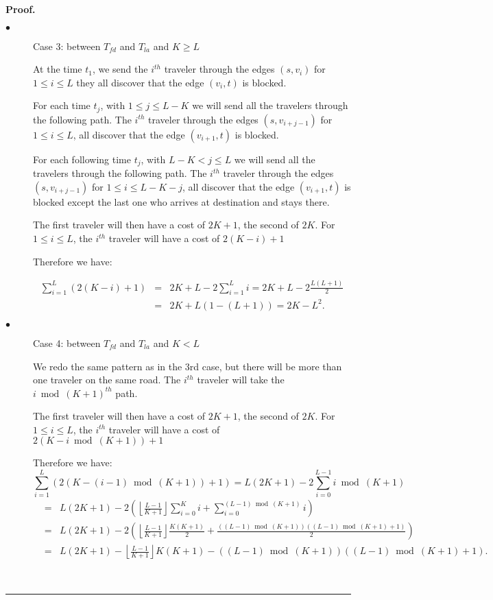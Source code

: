 \documentclass[a4paper, 10pt]{article}
\newenvironment{proof}[1][Proof]{\textbf{#1.} }{\ \rule{0.5em}{0.5em}}
\begin{document}
\begin{proof}
\begin{description}
\item[$\bullet$] Case 3: between $T_{fd}$ and $T_{la}$ and $K \geq L$

At the time $t_1$, we send the $i^{th}$ traveler through the edges $(s,v_i)$ for $1 \leq i \leq L$ they all discover that the edge $(v_i,t)$ is blocked.

For each time $t_j$, with $1 \leq j \leq L-K$ we will send all the travelers through the following path. The $i^{th}$ traveler through the edges $(s,v_{i+j-1})$ for $1 \leq i \leq L$, all discover that the edge $(v_{i+1},t)$ is blocked.

For each following time $t_j$, with $L-K < j \leq L$ we will send all the travelers through the following path. The $i^{th}$ traveler through the edges $(s,v_{i+j-1})$ for $1 \leq i \leq L-K-j$, all discover that the edge $(v_{i+1},t)$ is blocked except the last one who arrives at destination and stays there.

The first traveler will then have a cost of $2K+1$, the second of $2K$. For $1 \leq i \leq L$, the $i^{th}$ traveler will have a cost of $2(K-i)+1$

Therefore we have:

\begin{eqnarray}
\sum_{i=1}^{L}(2(K-i)+1)
&=& 2K + L - 2\sum_{i=1}^{L}i
= 2K + L - 2\frac{L(L+1)}{2} \nonumber \\
&=& 2K + L(1-(L+1))
= 2K - L^2.\nonumber
\end{eqnarray}

\item[$\bullet$] Case 4: between $T_{fd}$ and $T_{la}$ and $K<L$

We redo the same pattern as in the 3rd case, but there will be more than one traveler on the same road. The $i^{th}$ traveler will take the $i\bmod{(K+1)}^{th}$ path.

The first traveler will then have a cost of $2K+1$, the second of $2K$. For $1 \leq i \leq L$, the $i^{th}$ traveler will have a cost of $2(K-i\bmod{(K+1)})+1$

Therefore we have:
\[
\sum_{i=1}^{L}(2(K-(i-1)\bmod{(K+1)})+1) = L(2K+1) - 2\sum_{i=0}^{L-1}i\bmod{(K+1)}
\]
\begin{eqnarray}
&=& L(2K + 1) - 2\left(\left\lfloor \frac{L-1}{K+1} \right\rfloor \sum_{i=0}^{K}i + \sum_{i=0}^{(L-1)\bmod(K+1)}i\right) \nonumber \\
&=& L(2K + 1) - 2\left(\left\lfloor \frac{L-1}{K+1} \right\rfloor\frac{K(K+1)}{2} + \frac{\left((L-1)\bmod(K+1)\right)\left((L-1)\bmod(K+1) + 1\right)}{2}\right)\nonumber \\
&=& L(2K + 1) - \left\lfloor \frac{L-1}{K+1} \right\rfloor K(K+1)- \left((L-1)\bmod(K+1)\right)\left((L-1)\bmod(K+1) + 1\right).\nonumber
\end{eqnarray}

\end{description}
\end{proof}
\end{document}
